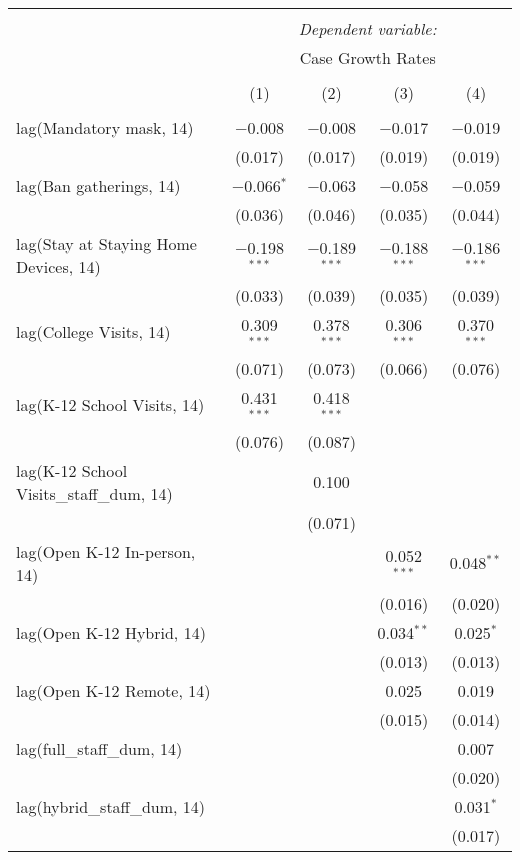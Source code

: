 \begin{tabular}{@{\extracolsep{1pt}}lcccc} 
\\[-1.8ex]\hline 
\hline \\[-1.8ex] 
 & \multicolumn{4}{c}{\textit{Dependent variable:}} \\ 
\cline{2-5} 
 & \multicolumn{4}{c}{Case Growth Rates} \\ 
\\[-1.8ex] & (1) & (2) & (3) & (4)\\ 
\hline \\[-1.8ex] 
 lag(Mandatory mask, 14) & $-$0.008 & $-$0.008 & $-$0.017 & $-$0.019 \\ 
  & (0.017) & (0.017) & (0.019) & (0.019) \\ 
  lag(Ban gatherings, 14) & $-$0.066$^{*}$ & $-$0.063 & $-$0.058 & $-$0.059 \\ 
  & (0.036) & (0.046) & (0.035) & (0.044) \\ 
  lag(Stay at Staying Home Devices, 14) & $-$0.198$^{***}$ & $-$0.189$^{***}$ & $-$0.188$^{***}$ & $-$0.186$^{***}$ \\ 
  & (0.033) & (0.039) & (0.035) & (0.039) \\ 
  lag(College Visits, 14) & 0.309$^{***}$ & 0.378$^{***}$ & 0.306$^{***}$ & 0.370$^{***}$ \\ 
  & (0.071) & (0.073) & (0.066) & (0.076) \\ 
  lag(K-12 School Visits, 14) & 0.431$^{***}$ & 0.418$^{***}$ &  &  \\ 
  & (0.076) & (0.087) &  &  \\ 
  lag(K-12 School Visits\_staff\_dum, 14) &  & 0.100 &  &  \\ 
  &  & (0.071) &  &  \\ 
  lag(Open K-12 In-person, 14) &  &  & 0.052$^{***}$ & 0.048$^{**}$ \\ 
  &  &  & (0.016) & (0.020) \\ 
  lag(Open K-12 Hybrid, 14) &  &  & 0.034$^{**}$ & 0.025$^{*}$ \\ 
  &  &  & (0.013) & (0.013) \\ 
  lag(Open K-12 Remote, 14) &  &  & 0.025 & 0.019 \\ 
  &  &  & (0.015) & (0.014) \\ 
  lag(full\_staff\_dum, 14) &  &  &  & 0.007 \\ 
  &  &  &  & (0.020) \\ 
  lag(hybrid\_staff\_dum, 14) &  &  &  & 0.031$^{*}$ \\ 
  &  &  &  & (0.017) \\ 

\end{tabular}
